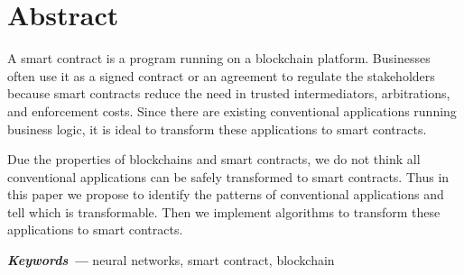 \chapter{Abstract}

A smart contract is a program running on a blockchain platform.
Businesses often use it as a signed contract or an agreement to regulate the stakeholders
because smart contracts reduce the need in trusted intermediators, arbitrations, and enforcement costs.
Since there are existing conventional applications running business logic,
it is ideal to transform these applications to smart contracts.

Due the properties of blockchains and smart contracts, we do not think all conventional applications can be safely transformed to smart contracts.
Thus in this paper we propose to identify the patterns of conventional applications and tell which is transformable.
Then we implement algorithms to transform these applications to smart contracts.

\textbf{\textit{Keywords ---}} neural networks, smart contract, blockchain